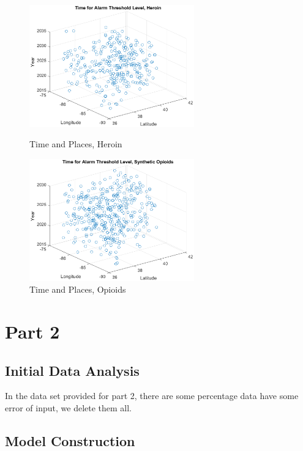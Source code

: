 \documentclass{mcmthesis}
\numberwithin{equation}{section}
\numberwithin{figure}{section}
\numberwithin{table}{section}
\theoremstyle{mydef}
\begin{document}
\begin{figure}[!htbp]
\begin{minipage}[t]{0.5\linewidth}
\centering
\includegraphics[width=2.8in]{./picture/timehe.eps}
\caption{Time and Places, Heroin}
\label{fig:left:4}
\end{minipage}%
\begin{minipage}[t]{0.5\linewidth}
\centering
\includegraphics[width=2.8in]{./picture/timeso.eps}
\caption{Time and Places, Opioids}
\label{fig:right:4}
\end{minipage}
\end{figure} 



\section{Part 2}

\subsection{Initial Data Analysis}

In the data set provided for part 2, there are some percentage data have some error of input, we delete them all.

\subsection{Model Construction}
\end{document}
